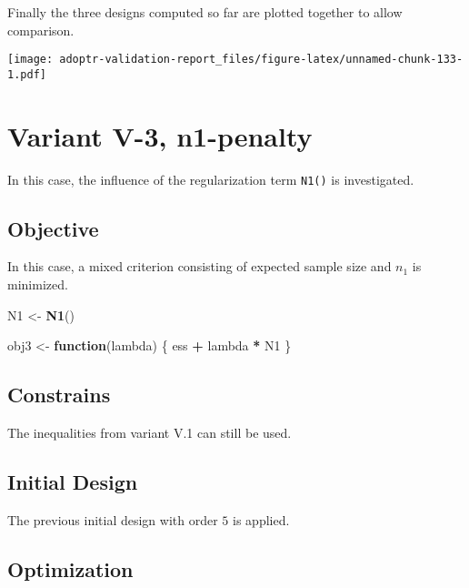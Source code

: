 \documentclass[]{book}
\newenvironment{Shaded}{\begin{snugshade}}{\end{snugshade}}
\newcommand{\ControlFlowTok}[1]{\textcolor[rgb]{0.13,0.29,0.53}{\textbf{#1}}}
\newcommand{\KeywordTok}[1]{\textcolor[rgb]{0.13,0.29,0.53}{\textbf{#1}}}
\newcommand{\NormalTok}[1]{#1}
\newcommand{\OperatorTok}[1]{\textcolor[rgb]{0.81,0.36,0.00}{\textbf{#1}}}
\newcommand{\StringTok}[1]{\textcolor[rgb]{0.31,0.60,0.02}{#1}}
\begin{document}
Finally the three designs computed so far are plotted together to allow
comparison.

\texttt{[image: adoptr-validation-report\_files/figure-latex/unnamed-chunk-133-1.pdf]}

\hypertarget{variantV_3}{%
\section{Variant V-3, n1-penalty}\label{variantV_3}}

In this case, the influence of the regularization term \texttt{N1()} is investigated.

\hypertarget{objective-12}{%
\subsection{Objective}\label{objective-12}}

In this case, a mixed criterion consisting of expected sample size and
\(n_1\) is minimized.

\begin{Shaded}
\begin{Highlighting}[]
\NormalTok{N1 <-}\StringTok{ }\KeywordTok{N1}\NormalTok{()}

\NormalTok{obj3 <-}\StringTok{ }\ControlFlowTok{function}\NormalTok{(lambda) \{}
\NormalTok{    ess }\OperatorTok{+}\StringTok{ }\NormalTok{lambda }\OperatorTok{*}\StringTok{ }\NormalTok{N1}
\NormalTok{\}}
\end{Highlighting}
\end{Shaded}

\hypertarget{constrains-12}{%
\subsection{Constrains}\label{constrains-12}}

The inequalities from variant V.1 can still be used.

\hypertarget{initial-design-11}{%
\subsection{Initial Design}\label{initial-design-11}}

The previous initial design with order \(5\) is applied.

\hypertarget{optimization-11}{%
\subsection{Optimization}\label{optimization-11}}
\end{document}
